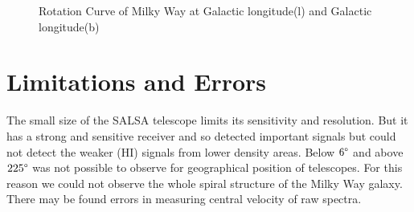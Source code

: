 \documentclass[10pt,conference]{IEEEtran}
\begin{document}
\begin{figure}[!t]
{\label{fig_sixth_case}}
\hfil
{}
\hfil
{}
\hfil
\caption{Rotation Curve of Milky Way at Galactic longitude(l) and Galactic longitude(b)}
\label{fig:rot}
\end{figure}

\section{Limitations and Errors}

The small size of the SALSA telescope limits its sensitivity and resolution. But it has a strong and sensitive receiver and so detected important signals but could not detect the weaker (HI) signals from lower density areas. Below $6\degree$ and above $225\degree$ was not possible to observe for geographical position of telescopes. For this reason we could not observe the whole spiral structure of the Milky Way galaxy. There may be found errors in measuring central velocity of raw spectra\cite{CathyHorellou2015,santo2013mapping}.
\end{document}
